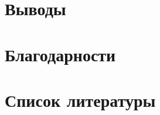 \documentclass[a4paper,12pt]{article} %
\begin{document}
\section{Выводы}
\section{Благодарности}
\section{Список литературы}


\printbibliography
\end{document}
